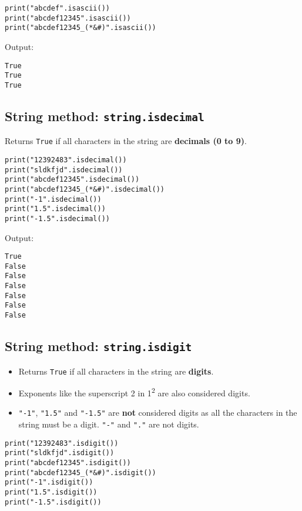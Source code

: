 \documentclass[11pt]{article}
\begin{document}
\begin{verbatim}
print("abcdef".isascii())
print("abcdef12345".isascii())
print("abcdef12345_(*&#)".isascii())
\end{verbatim}

 \noindent Output:

\label{org783651c}
\begin{verbatim}
True
True
True
\end{verbatim}
\subsection{String method: \texttt{string.isdecimal}}
\label{sec:org6a16ab3}
Returns \texttt{True} if all characters in the string are \textbf{decimals (0 to 9)}.

\begin{verbatim}
print("12392483".isdecimal())
print("sldkfjd".isdecimal())
print("abcdef12345".isdecimal())
print("abcdef12345_(*&#)".isdecimal())
print("-1".isdecimal())
print("1.5".isdecimal())
print("-1.5".isdecimal())
\end{verbatim}

 \noindent Output:

\label{org4c7090b}
\begin{verbatim}
True
False
False
False
False
False
False
\end{verbatim}


 \newpage
\subsection{String method: \texttt{string.isdigit}}
\label{sec:orgece8e8d}
\begin{itemize}
\item Returns \texttt{True} if all characters in the string are \textbf{digits}.
\item Exponents like the superscript 2 in 1\textsuperscript{2} are also considered digits.
\item \texttt{"-1"}, \texttt{"1.5"} and \texttt{"-1.5"} are \textbf{not} considered digits as all the characters in the string must be a digit. \texttt{"-"} and \texttt{"."} are not digits.
\end{itemize}

\begin{verbatim}
print("12392483".isdigit())
print("sldkfjd".isdigit())
print("abcdef12345".isdigit())
print("abcdef12345_(*&#)".isdigit())
print("-1".isdigit())
print("1.5".isdigit())
print("-1.5".isdigit())
\end{verbatim}
\end{document}
